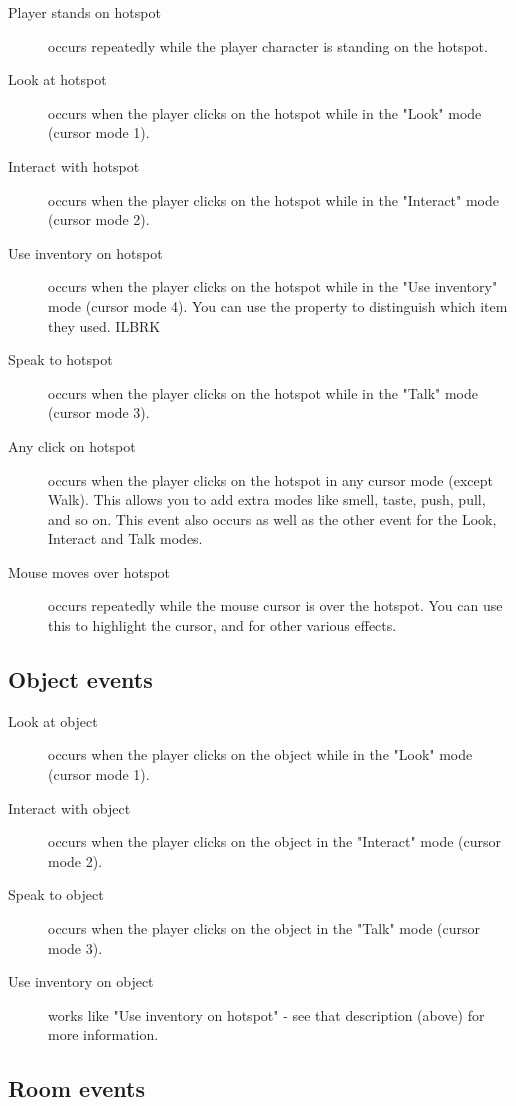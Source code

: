 \begin{description}
\item [Player stands on hotspot] occurs repeatedly while the player character
is standing on the hotspot.
\item [Look at hotspot] occurs when the player clicks on the hotspot while in
the "Look" mode (cursor mode 1).
\item [Interact with hotspot] occurs when the player clicks on the hotspot while
in the "Interact" mode (cursor mode 2).
\item [Use inventory on hotspot] occurs when the player clicks on the hotspot
while in the "Use inventory" mode (cursor mode 4). You can use the
 property to distinguish
which item they used. ILBRK
\item [Speak to hotspot] occurs when the player clicks on the hotspot while in
the "Talk" mode (cursor mode 3).
\item [Any click on hotspot] occurs when the player clicks on the hotspot in
any cursor mode (except Walk). This allows you to add extra modes like
smell, taste, push, pull, and so on. This event also occurs as well as
the other event for the Look, Interact and Talk modes.
\item [Mouse moves over hotspot] occurs repeatedly while the mouse cursor is
over the hotspot. You can use this to highlight the cursor, and for other
various effects.
\end{description}

\subsection{Object events}%

\begin{description}
\item [Look at object] occurs when the player clicks on the object while in
the "Look" mode (cursor mode 1).
\item [Interact with object] occurs when the player clicks on the object in
the "Interact" mode (cursor mode 2).
\item [Speak to object] occurs when the player clicks on the object in the
"Talk" mode (cursor mode 3).
\item [Use inventory on object] works like "Use inventory on hotspot" - see
that description (above) for more information.
\end{description}

\subsection{Room events}%

